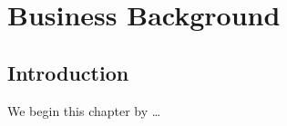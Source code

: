 %
%
%
%

\chapter{Business Background}\label{C.Business.Background}

\section{Introduction}\label{S.intro2}

We begin this chapter by \ldots

